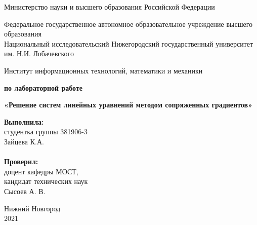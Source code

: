 \documentclass{report}
\begin{document}
\begin{titlepage}

\begin{center}
Министерство науки и высшего образования Российской Федерации
\end{center}

\begin{center}
Федеральное государственное автономное образовательное учреждение высшего образования \\
Национальный исследовательский Нижегородский государственный университет им. Н.И. Лобачевского
\end{center}

\begin{center}
Институт информационных технологий, математики и механики
\end{center}

\vspace{4em}

\begin{center}
\textbf{ по лабораторной работе} \\
\end{center}
\begin{center}
\textbf{\Large«Решение систем линейных уравнений методом сопряженных градиентов»} \\
\end{center}

\vspace{4em}

\newbox{\lbox}
\newlength{\maxl}
\setlength{\maxl}{\wd\lbox}
\hfill\parbox{7cm}{
\hspace*{5cm}\hspace*{-5cm}\textbf{Выполнила:} \\ студентка группы 381906-3 \\ Зайцева К.А.\\
\\
\hspace*{5cm}\hspace*{-5cm}\textbf{Проверил:}\\ доцент кафедры МОСТ, \\ кандидат технических наук \\ Сысоев А. В.\\
}
\vspace{\fill}

\begin{center} Нижний Новгород \\ 2021 \end{center}

\end{titlepage}
\end{document}
